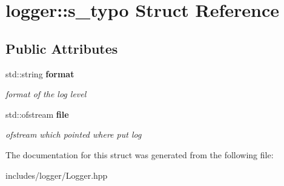 \section{logger\+:\+:s\+\_\+typo Struct Reference}
\label{structlogger_1_1s__typo}
\subsection*{Public Attributes}
\begin{DoxyCompactItemize}
\item 
\mbox{\label{structlogger_1_1s__typo_a4523814ca3b3d3c7596bb5651c1376bc}} 
std\+::string \textbf{ format}
\begin{DoxyCompactList}\small\item\em format of the log level \end{DoxyCompactList}\item 
\mbox{\label{structlogger_1_1s__typo_af125bb498bedcab1c10cc31fe5342972}} 
std\+::ofstream \textbf{ file}
\begin{DoxyCompactList}\small\item\em ofstream which pointed where put log \end{DoxyCompactList}\end{DoxyCompactItemize}


The documentation for this struct was generated from the following file\+:\begin{DoxyCompactItemize}
\item 
includes/logger/Logger.\+hpp\end{DoxyCompactItemize}

